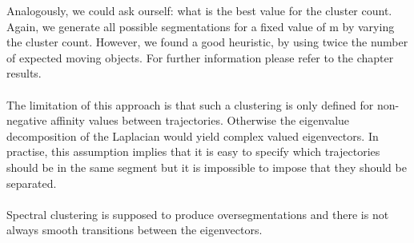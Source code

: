 Analogously, we could ask ourself: what is the best value for the cluster count. Again, we generate all possible segmentations for a fixed value of m by varying the cluster count. However, we found a good heuristic, by using twice the number of expected moving objects. For further information please refer to the chapter results. \\ \\
The limitation of this approach is that such a clustering is only defined for non-negative affinity values between trajectories. Otherwise the eigenvalue decomposition of the Laplacian would yield complex valued eigenvectors. In practise, this assumption implies that it is easy to specify which trajectories should be in the same segment but it is impossible to impose that they should be separated. \\ \\
Spectral clustering is supposed to produce oversegmentations and there is not always smooth transitions between the eigenvectors.
